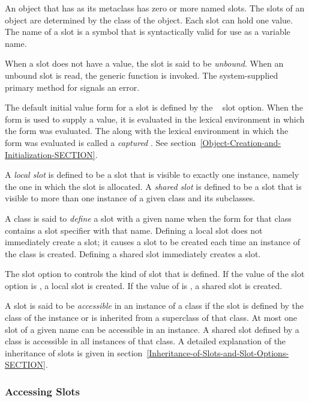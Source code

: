 An object that has  as its metaclass has zero or
more named slots.  The slots of an object are determined by the class
of the object.  Each slot can hold one value.  The name of a slot is a
symbol that is syntactically valid for use as a variable
name.

When a slot does not have a value, the slot is said to be \emph{unbound}.  When
an unbound slot is read, the generic function  is invoked. The
system-supplied primary method for  signals an error. 

The default initial value form for a slot is defined by the \hbox{
} slot option. When the  form is used to
supply a value, it is evaluated in the lexical environment in which
the  form was evaluated. The  along with
the lexical environment in which the  form was evaluated
is called a \emph{captured\/} .
See section~\ref{Object-Creation-and-Initialization-SECTION}.

A \emph{local slot\/} is defined to be a slot that is visible to exactly
one instance, namely the one in which the slot is allocated.  A \emph{shared
  slot\/} is defined to be a slot that is visible to more than one instance of a
given class and its subclasses. 

A class is said to \emph{define\/} a slot with a given name when
the  form for that class contains a slot specifier with
that name.  Defining a local slot does not immediately create a slot;
it causes a slot to be created each time an instance of the class is
created.  Defining a shared slot immediately creates a slot.

The  slot option to  controls the kind
of slot that is defined.  If the value of the  slot
option is , a local slot is created.  If the value of
 is , a shared slot is created.

A slot is said to be \emph{accessible\/} in an instance of a class if
the slot is defined by the class of the instance or is inherited from
a superclass of that class.  At most one slot of a given name can be
accessible in an instance.  A shared slot defined by a class is
accessible in all instances of that class.  A detailed explanation of
the inheritance of slots is given in
section~\ref{Inheritance-of-Slots-and-Slot-Options-SECTION}.

\subsubsection{Accessing Slots}

